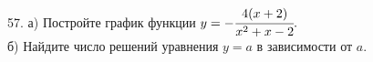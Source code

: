57. а) Постройте график функции $y=-\cfrac{4(x+2)}{x^2+x-2}.$\\
б) Найдите число решений уравнения $y=a$ в зависимости от $a.$\\
